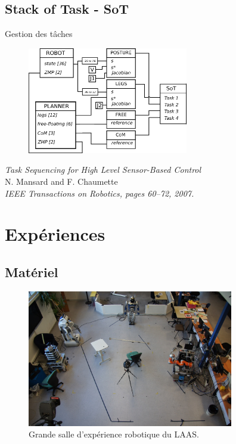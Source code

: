 \documentclass{beamer}
\begin{document}
\subsection{Stack of Task - SoT}
\begin{frame}
  \begin{center}
    Gestion des tâches
    \begin{figure}
      \includegraphics[width=7cm]{./images/SoT.png}
    \end{figure}

    \begin{small}
      \emph{Task Sequencing for High Level Sensor-Based Control}\\
      N. Mansard and F. Chaumette\\
      \textit{IEEE Transactions on Robotics, pages 60–72, 2007.}
  \end{small}
  \end{center}
\end{frame}


\section{Expériences}
\subsection{Matériel}
\begin{frame}
  \begin{figure}
    \includegraphics[width=9cm]{./images/grande_salle.jpg}\\
    Grande salle d'expérience robotique du LAAS.
  \end{figure}
\end{frame}
\end{document}
